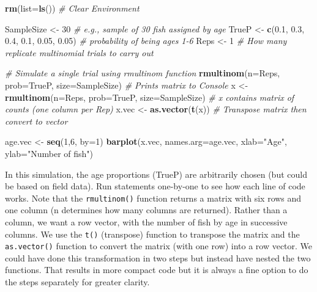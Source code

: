 \documentclass[
]{krantz}
\makeatletter
\newenvironment{Shaded}{\begin{snugshade}}{\end{snugshade}}
\newcommand{\AttributeTok}[1]{\textcolor[rgb]{0.27,0.27,0.27}{#1}}
\newcommand{\CommentTok}[1]{\textcolor[rgb]{0.37,0.37,0.37}{\textit{#1}}}
\newcommand{\DecValTok}[1]{\textcolor[rgb]{0.06,0.06,0.06}{#1}}
\newcommand{\FloatTok}[1]{\textcolor[rgb]{0.06,0.06,0.06}{#1}}
\newcommand{\FunctionTok}[1]{\textcolor[rgb]{0.27,0.27,0.27}{\textbf{#1}}}
\newcommand{\NormalTok}[1]{#1}
\newcommand{\OtherTok}[1]{\textcolor[rgb]{0.37,0.37,0.37}{#1}}
\newcommand{\StringTok}[1]{\textcolor[rgb]{0.5,0.5,0.5}{#1}}
\newenvironment{kframe}{%
\medskip{}
\setlength{\fboxsep}{.8em}
 \def\at@end@of@kframe{}%
 \ifinner\ifhmode%
  \def\at@end@of@kframe{\end{minipage}}%
  \begin{minipage}{\columnwidth}%
 \fi\fi%
 \def\FrameCommand##1{\hskip\@totalleftmargin \hskip-\fboxsep
 \colorbox{shadecolor}{##1}\hskip-\fboxsep
     \hskip-\linewidth \hskip-\@totalleftmargin \hskip\columnwidth}%
 \MakeFramed {\advance\hsize-\width
   \@totalleftmargin\z@ \linewidth\hsize
   \@setminipage}}%
 {\par\unskip\endMakeFramed%
 \at@end@of@kframe}
\renewenvironment{Shaded}{\begin{kframe}}{\end{kframe}}
\makeatother
\begin{document}
\begin{Shaded}
\begin{Highlighting}[]
\FunctionTok{rm}\NormalTok{(}\AttributeTok{list=}\FunctionTok{ls}\NormalTok{()) }\CommentTok{\# Clear Environment}

\NormalTok{SampleSize }\OtherTok{\textless{}{-}} \DecValTok{30}  \CommentTok{\# e.g., sample of 30 fish assigned by age}
\NormalTok{TrueP }\OtherTok{\textless{}{-}} \FunctionTok{c}\NormalTok{(}\FloatTok{0.1}\NormalTok{, }\FloatTok{0.3}\NormalTok{, }\FloatTok{0.4}\NormalTok{, }\FloatTok{0.1}\NormalTok{, }\FloatTok{0.05}\NormalTok{, }\FloatTok{0.05}\NormalTok{) }\CommentTok{\# probability of being ages 1{-}6}
\NormalTok{Reps }\OtherTok{\textless{}{-}} \DecValTok{1} \CommentTok{\# How many replicate multinomial trials to carry out}

\CommentTok{\# Simulate a single trial using rmultinom function}
\FunctionTok{rmultinom}\NormalTok{(}\AttributeTok{n=}\NormalTok{Reps, }\AttributeTok{prob=}\NormalTok{TrueP, }\AttributeTok{size=}\NormalTok{SampleSize) }\CommentTok{\# Prints matrix to Console}
\NormalTok{x }\OtherTok{\textless{}{-}} \FunctionTok{rmultinom}\NormalTok{(}\AttributeTok{n=}\NormalTok{Reps, }\AttributeTok{prob=}\NormalTok{TrueP, }\AttributeTok{size=}\NormalTok{SampleSize)}
\CommentTok{\# x contains matrix of counts (one column per Rep)}
\NormalTok{x.vec }\OtherTok{\textless{}{-}} \FunctionTok{as.vector}\NormalTok{(}\FunctionTok{t}\NormalTok{(x)) }\CommentTok{\# Transpose matrix then convert to vector}

\NormalTok{age.vec }\OtherTok{\textless{}{-}} \FunctionTok{seq}\NormalTok{(}\DecValTok{1}\NormalTok{,}\DecValTok{6}\NormalTok{, }\AttributeTok{by=}\DecValTok{1}\NormalTok{)}
\FunctionTok{barplot}\NormalTok{(x.vec, }\AttributeTok{names.arg=}\NormalTok{age.vec, }\AttributeTok{xlab=}\StringTok{"Age"}\NormalTok{, }\AttributeTok{ylab=}\StringTok{"Number of fish"}\NormalTok{)}
\end{Highlighting}
\end{Shaded}

In this simulation, the age proportions (TrueP) are arbitrarily chosen (but could be based on field data). Run statements one-by-one to see how each line of code works. Note that the \texttt{rmultinom()} function returns a matrix with six rows and one column (n determines how many columns are returned). Rather than a column, we want a row vector, with the number of fish by age in successive columns. We use the \texttt{t()} (transpose) function to transpose the matrix and the \texttt{as.vector()} function to convert the matrix (with one row) into a row vector. We could have done this transformation in two steps but instead have nested the two functions. That results in more compact code but it is always a fine option to do the steps separately for greater clarity.
\end{document}
